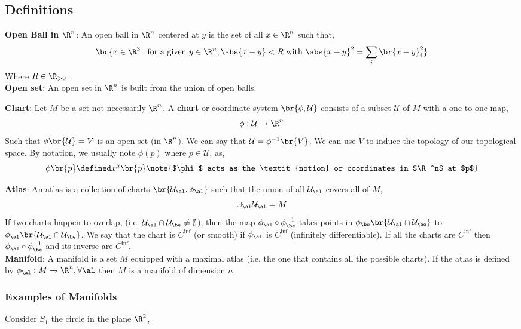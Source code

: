 \documentclass{article}
\begin{document}
\subsection{Definitions}

\textbf{Open Ball in $\R^n$}: An open ball in $\R^n$ centered at $y$ is the set of all $x \in \R^n$ such that,
\[ \bc{x \in \R^3 \mid \text{for a given } y \in \R^n, \abs{x - y} < R \text{ with } \abs{x-y}^2 = \sum_i \br{x-y}_i^2} \]
Where $R \in \R_{>0}$.\\

\textbf{Open set}: An open set in $\R^n$ is built from the union of open balls.

\textbf{Chart}: Let $M$ be a set not necessarily $\R^n$. A \textbf{chart} or coordinate system $\br{\phi, \mathcal{U}}$ consists of a subset $\mathcal{U}$ of $M$ with a one-to-one map,
\[ \phi : \mathcal{U} \to \R^n \]
Such that $\phi\br{\mathcal{U}} = V$ is an open set (in $\R^n$). We can say that $\mathcal{U} = \phi^{-1}\br{V}$. We can use $V$ to induce the topology of our topological space. By notation, we usually note $\phi(p)$ where $p \in \mathcal{U}$, as,
\[ \phi\br{p} \defined x^{\mu} \br{p} \note{$\phi$ acts as the \textit{notion} or coordinates in $\R^n$ at $p$} \]

\textbf{Atlas}: An atlas is a collection of charts $\br{\mathcal{U}_\al, \phi_\al}$ such that the union of all $\mathcal{U}_\al$ covers all of $M$,
\[ \cup_\al \mathcal{U}_\al = M \]
If two charts happen to overlap, (i.e. $\mathcal{U}_\al \cap \mathcal{U}_\be \neq \emptyset$), then the map $\phi_\al \circ \phi_\be^{-1}$ takes points in $\phi_\be \br{\mathcal{U}_\al\cap\mathcal{U}_\be}$ to $\phi_\al \br{\mathcal{U}_\al\cap\mathcal{U}_\be}$. We say that the chart is $C^\inf$ (or smooth) if $\phi_\al$ is $C^\inf$ (infinitely differentiable). If all the charts are $C^\inf$ then $\phi_\al \circ \phi_\be^{-1}$ and its inverse are $C^\inf$. \\

\textbf{Manifold}: A manifold is a set $M$ equipped with a maximal atlas (i.e. the one that contains all the possible charts). If the atlas is defined by $\phi_\al : M \to \R^n, \forall \al$ then $M$ is a manifold of dimension $n$.

\subsubsection{Examples of Manifolds}

Consider $S_1$ the circle in the plane $\R^2$,
\end{document}
